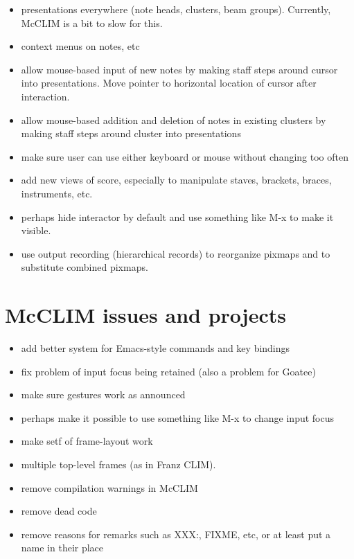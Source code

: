 \begin{itemize}
\item presentations everywhere (note heads, clusters, beam groups).
  Currently, McCLIM is a bit to slow for this.  
\item context menus on notes, etc
\item allow mouse-based input of new notes by making staff steps
  around cursor into presentations.  Move pointer to horizontal
  location of cursor after interaction.
\item allow mouse-based addition and deletion of notes in existing
  clusters by making staff steps around cluster into presentations
\item make sure user can use either keyboard or mouse without changing
  too often
\item add new views of score, especially to manipulate staves,
  brackets, braces, instruments, etc.
\item perhaps hide interactor by default and use something like M-x to
  make it visible. 
\item use output recording (hierarchical records) to reorganize pixmaps
  and to substitute combined pixmaps. 
\end{itemize}

\section{McCLIM issues and projects}

\begin{itemize}
\item add better system for Emacs-style commands and key
  bindings 
\item fix problem of input focus being retained (also a
  problem for Goatee)
\item make sure gestures work as announced
\item perhaps make it possible to use something like M-x to change
  input focus
\item make setf of frame-layout work
\item multiple top-level frames (as in Franz CLIM).
\item remove compilation warnings in McCLIM
\item remove dead code
\item remove reasons for remarks such as XXX:, FIXME, etc, or at least
  put a name in their place
\end{itemize}